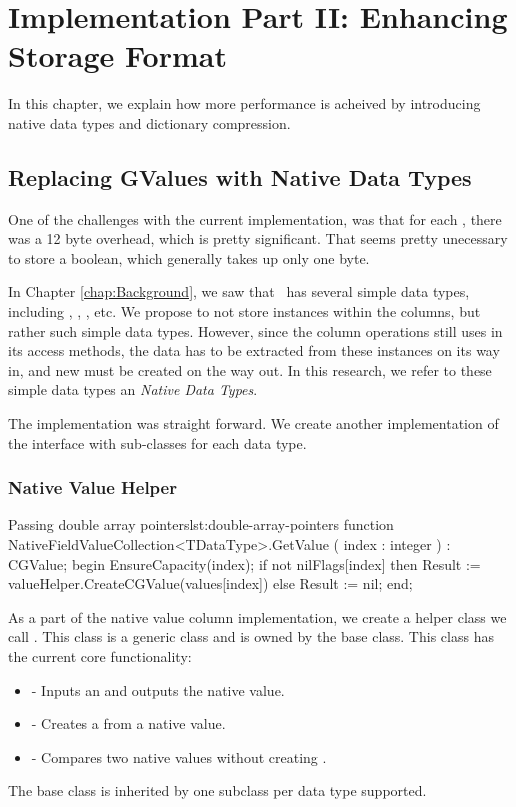 \chapter{Implementation Part II: Enhancing Storage Format}
\label{chap:part2}
In this chapter, we explain how more performance is acheived by introducing native data types and dictionary compression.

\section{Replacing GValues with Native Data Types}
\label{sec:Replacing GValues with Native Data Types}
One of the challenges with the current implementation, was that for each , there was a 12 byte overhead, which is pretty significant. That seems pretty unecessary to store a boolean, which generally takes up only one byte. 

In Chapter \ref{chap:Background}, we saw that \delphi~has several simple data types, including , , , etc. We propose to not store  instances within the columns, but rather such simple data types. However, since the column operations still uses  in its access methods, the data has to be extracted from these instances on its way in, and new  must be created on the way out. In this research, we refer to these simple data types an \textit{Native Data Types}.

The implementation was straight forward. We create another implementation of the  interface with sub-classes for each data type. 

\subsection{Native Value Helper}
\label{sub:Native Value Helper}
\begin{delphicode}{Passing double array pointers}{lst:double-array-pointers}
function NativeFieldValueCollection<TDataType>.GetValue
( index : integer )
: CGValue;
begin
  EnsureCapacity(index);
  if not nilFlags[index] then
    Result := valueHelper.CreateCGValue(values[index])
  else
    Result := nil;
end;
\end{delphicode}
As a part of the native value column implementation, we create a helper class we call . This class is a generic class and is owned by the  base class. This class has the current core functionality:
\begin{itemize}
    \item {} - Inputs an  and outputs the native value.
    \item {} - Creates a  from a native value.
    \item {} - Compares two native values without creating .
\end{itemize}
The base class is inherited by one subclass per data type supported.

